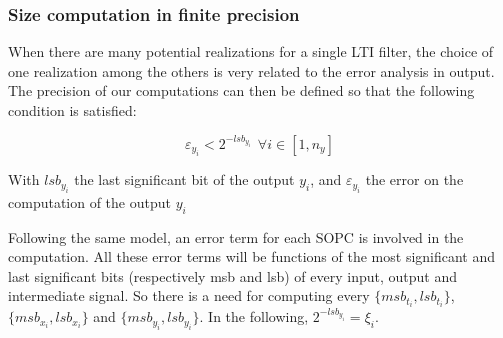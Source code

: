 	\subsubsection{Size computation in finite precision}
	When there are many potential realizations for a single LTI filter, the choice of one realization
	among the others is very related to the error analysis in output.
	The precision of our computations can then be defined so that the following condition is satisfied:

	\begin{equation} \label{condition}
		\varepsilon_{y_i} < 2^{-lsb_{y_i}} \hspace{5pt} \forall i \in [1,n_y]
	\end{equation}

	With $lsb_{y_i}$ the last significant bit of the output $y_i$, and $\varepsilon_{y_i}$ the error on the computation of the output $y_i$

	Following the same model, an error term for each SOPC is involved in the computation.
	All these error terms will be functions of the most significant and last significant bits (respectively msb and lsb) of every input, output and intermediate signal.
	So there is a need for computing every $\{msb_{t_i},lsb_{t_i}\}$, $\{msb_{x_i},lsb_{x_i}\}$ and $\{msb_{y_i},lsb_{y_i}\}$.
	In the following, $2^{-lsb_{y_i}}=\xi_i$.

%


